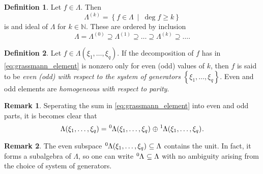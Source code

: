 \documentclass{article}
\theoremstyle{definition}
\newtheorem{definition}{Definition}
\newtheorem*{remark}{Remark}
\begin{document}
\begin{definition}
    Let $f \in \Lambda$. Then 
    \begin{equation*}
        \Lambda^{(k)} = \left\{ f \in \Lambda \ \middle| \ \deg f \geq k \right\}
    \end{equation*}
    is and ideal of $\Lambda$ for $k \in \mathbb{N}$. These are ordered by inclusion
    \begin{equation*}
        \Lambda = \Lambda^{(0)} \supseteq \Lambda^{(1)} \supseteq \dots
        \supseteq \Lambda^{(k)} \supseteq \dots.
    \end{equation*}
\end{definition}

\begin{definition}
    Let $f \in \Lambda(\xi_1, \dots, \xi_q)$. If the decomposition of $f$ has in \eqref{eq:grassmann_element} is nonzero only for even (odd) values of $k$, then $f$ is said to be \emph{even (odd) with respect to the system of generators} $\left\{ \xi_1, \dots, \xi_q \right\}$. Even and odd elements are \emph{homogeneous with respect to parity}.
\end{definition}

\begin{remark}
    Seperating the sum in \eqref{eq:grassmann_element} into even and odd parts, it is becomes clear that
    \begin{equation*}
        \Lambda(\xi_1, \dots, \xi_q) = \tensor[^0]{\Lambda(\xi_1, \dots, \xi_q)}{} \oplus \tensor[^1]{\Lambda(\xi_1, \dots, \xi_q)}{}.
    \end{equation*}
\end{remark}

\begin{remark}
    The even subspace $\tensor[^0]{\Lambda(\xi_1, \dots, \xi_q)}{} \subseteq \Lambda$ contains the unit. In fact, it forms a subalgebra of $\Lambda$, so one can write $\tensor[^0]{\Lambda}{} \subseteq \Lambda$ with no ambiguity arising from the choice of system of generators.
\end{remark}
\end{document}
